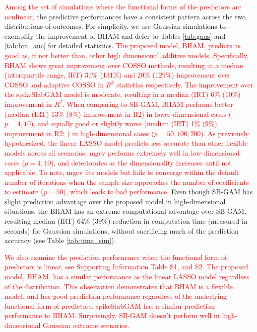 \documentclass[AMA,STIX1COL,]{WileyNJD-v2}
\begin{document}
\textcolor{red}{Among the set of simulations where the functional forms of the predictors are nonlinear,}
the predictive performances have a consistent pattern across the two
distributions of outcomes. For simplicity, we use Gaussian simulations
to exemplify the improvement of BHAM and defer to Tables \ref{tab:gaus}
and \ref{tab:bin_auc} for detailed statistics.
\textcolor{red}{The proposed model, BHAM, predicts as good as, if not better than, other high dimensional additive models. Specifically, BHAM shows great improvement over COSSO methods, resulting in a median (interquartile range, IRT) 31\% (131\%) and 20\% (129\%) improvement over COSSO and adaptive COSSO in $R^2$ statistics respectively. The improvement over the spikeSlabGAM model is moderate, resulting in a median (IRT) 6\% (10\%) improvement in $R^2$. When comparing to SB-GAM, BHAM performs better (median (IRT) 13\% (8\%) improvement in R2) in lower dimensional cases ($p=4,10$), and equally good or slightly worse (median (IRT) 1\% (9\%) improvement in R2: ) in high-dimensional cases ($p=50,100, 200$). As previously hypothesized, the linear LASSO model predicts less accurate than other flexible models across all scenarios; mgcv performs extremely well in low-dimensional cases ($p = 4, 10$), and deteriorates as the dimensionality increases until not applicable. To note, mgcv fits models but fails to converge within the default number of iterations when the sample size approaches the number of coefficients to estimate ($p=50$), which leads to bad performance.}
Even though SB-GAM has slight prediction advantage over the proposed
model in high-dimensional situations, the BHAM has an extreme
computational advantage over SB-GAM, resulting median (IRT) 64\% (39\%)
reduction in computation time (measured in seconds) for Gaussian
simulations, without sacrificing much of the prediction accuracy (see
Table \ref{tab:time_sim}).

\textcolor{red}{We also examine the prediction performance when the functional form of predictors is linear, see Supporting Information Table S1, and S2. The proposed model, BHAM, has a similar performance as the linear LASSO model regardless of the distribution. This observation demonstrates that BHAM is a flexible model, and has good prediction performance regardless of the underlying functional form of predictors. spikeSlabGAM has a similar prediction performance to BHAM. Surprisingly, SB-GAM doesn't perform well in high-dimensional Gaussian outcome scenarios.}
\end{document}
